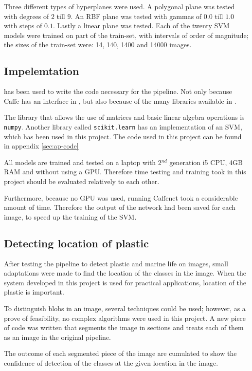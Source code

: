 Three different types of hyperplanes were used.
A polygonal plane was tested with degrees of $2$ till $9$.
An RBF plane was tested with gammas of $0.0$ till $1.0$ with steps of $0.1$.
Lastly a linear plane was tested.
Each of the twenty SVM models were trained on part of the train-set, with intervals of order of magnitude; the sizes of the train-set were: 14, 140, 1400 and 14000 images.

\subsection{Impelemtation}
\label{sec:Method-implementation}
\Python has been used to write the code necessary for the pipeline.
Not only because Caffe has an interface in \Python, but also because of the many libraries available in \Python.

The library that allows the use of matrices and basic linear algebra operations is \texttt{numpy}.
Another library called \texttt{scikit.learn} has an implementation of an SVM, which has been used in this project.
The code used in this project can be found in appendix \ref{sec:ap-code}

All models are trained and tested on a laptop with 2$^{nd}$ generation i5 CPU, 4GB RAM and without using a GPU. Therefore time testing and training took in this project should be evaluated relatively to each other.

Furthermore, because no GPU was used, running Caffenet took a considerable amount of time. Therefore the output of the network had been saved for each image, to speed up the training of the SVM.

\subsection{Detecting location of plastic}
\label{sec:Method-location}
After testing the pipeline to detect plastic and marine life on images, small adaptations were made to find the location of the classes in the image.
When the system developed in this project is used for practical applications, location of the plastic is important.

To distinguish blobs in an image, several techniques could be used; however, as a prove of feasibility, no complex algorithms were used in this project.
A new piece of code was written that segments the image in sections and treats each of them as an image in the original pipeline.

The outcome of each segmented piece of the image are cumulated to show the confidence of detection of the classes at the given location in the image.

